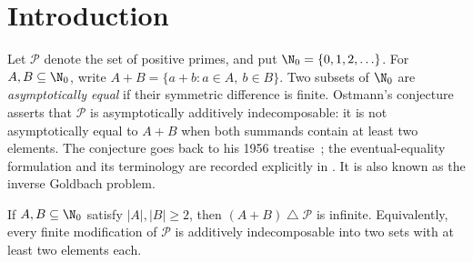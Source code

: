 \section{Introduction}\label{sec:introduction}

Let $\mathcal P$ denote the set of positive primes, and put
$\N_0=\{0,1,2,\ldots\}$.  For $A,B\subseteq\N_0$, write
$A+B=\{a+b:a\in A,\ b\in B\}$.  Two subsets of $\N_0$ are
\emph{asymptotically equal} if their symmetric difference is finite.
Ostmann's conjecture asserts that $\mathcal P$ is asymptotically
additively indecomposable: it is not asymptotically equal to $A+B$ when
both summands contain at least two elements.  The conjecture goes back
to his 1956 treatise~\cite[p.~13]{Ostmann1956}; the eventual-equality
formulation and its terminology are recorded explicitly in
\cite[Definition~1.1 and Conjecture~1.2]{ElsholtzHarper}.
It is also known as the inverse Goldbach problem.

\begin{theorem}\label{cor:ostmann}
If $A,B\subseteq\N_0$ satisfy $|A|,|B|\ge2$, then
$(A+B)\mathbin{\triangle}\mathcal P$ is infinite.
Equivalently, every finite modification of $\mathcal P$ is additively
indecomposable into two sets with at least two elements each.
\end{theorem}

